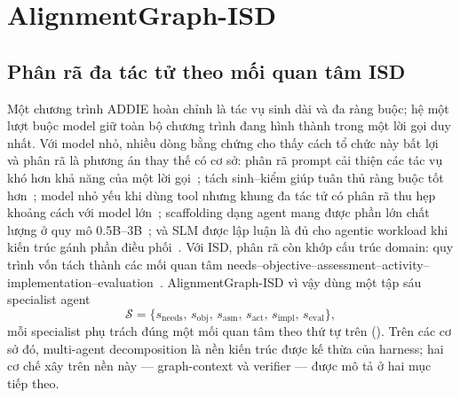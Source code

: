 \section{AlignmentGraph-ISD}
\label{sec:method}

\subsection{Phân rã đa tác tử theo mối quan tâm ISD}
\label{sec:decomposition}

Một chương trình ADDIE hoàn chỉnh là tác vụ sinh dài và đa ràng buộc; hệ một lượt
buộc model giữ toàn bộ chương trình đang hình thành trong một lời gọi duy nhất.
Với model nhỏ, nhiều dòng bằng chứng cho thấy cách tổ chức này bất lợi và phân rã
là phương án thay thế có cơ sở: phân rã prompt cải thiện các tác vụ khó hơn khả
năng của một lời gọi~\cite{zhou2023leasttomost,khot2023decomposed}; tách
sinh--kiểm giúp tuân thủ ràng buộc tốt hơn~\cite{ferraz2024decrim}; model nhỏ yếu
khi dùng tool nhưng khung đa tác tử có phân rã thu hẹp khoảng cách với model
lớn~\cite{shen2024multillmagent}; scaffolding dạng agent mang được phần lớn chất
lượng ở quy mô 0.5B--3B~\cite{kang2025agentdistill}; và SLM được lập luận là đủ
cho agentic workload khi kiến trúc gánh phần điều phối~\cite{belcak2025slm}. Với
ISD, phân rã còn khớp cấu trúc domain: quy trình vốn tách thành các mối quan tâm
needs--objective--assessment--activity--implementation--evaluation~\cite{branch2009addie}.
AlignmentGraph-ISD vì vậy dùng một tập sáu specialist agent
\[
\mathcal{S}=\{s_{\mathrm{needs}},\,s_{\mathrm{obj}},\,s_{\mathrm{asm}},\,
s_{\mathrm{act}},\,s_{\mathrm{impl}},\,s_{\mathrm{eval}}\},
\]
mỗi specialist phụ trách đúng một mối quan tâm theo thứ tự trên
(). Trên các cơ sở đó, multi-agent decomposition là nền
kiến trúc được kế thừa của harness; hai cơ chế xây trên nền này ---
graph-context và verifier --- được mô tả ở hai mục tiếp theo.

